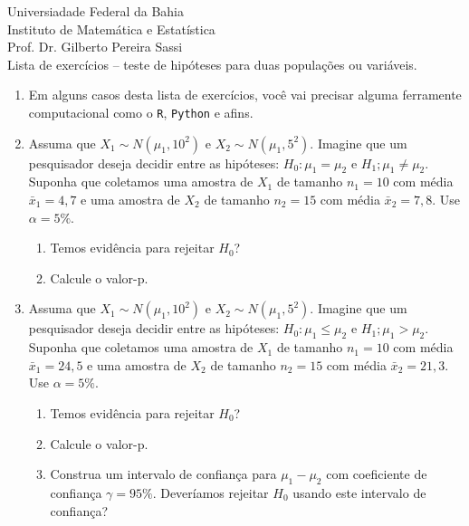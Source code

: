 \documentclass[8pt, a4paper]{article}
\begin{document}
\begin{center}
Universiadade Federal da Bahia\\
Instituto de Matemática e Estatística\\
Prof. Dr. Gilberto Pereira Sassi\\
\vspace{1cm}
Lista de exercícios -- teste de hipóteses para duas populações ou variáveis.
\vspace{1cm}
\end{center}

\begin{enumerate}
	\item[] Em alguns casos desta lista de exercícios, você vai precisar alguma ferramente computacional como o \texttt{R}, \texttt{Python} e afins.
	\item Assuma que $X_1 \sim N(\mu_1, 10^2)$ e $X_2 \sim N(\mu_1, 5^2)$. Imagine que um pesquisador deseja decidir entre as hipóteses: $H_0: \mu_1 = \mu_2$  e $H_1; \mu_1 \neq \mu_2$. Suponha que coletamos uma amostra de $X_1$ de tamanho $n_1=10$ com média $\bar{x}_1=4,7$ e uma amostra de $X_2$ de tamanho $n_2=15$ com média $\bar{x}_2=7,8$. Use $\alpha=5\%$.
	\begin{enumerate}
		\item Temos evidência para rejeitar $H_0$?
		\item Calcule o valor-p. 
	\end{enumerate}

	\item Assuma que $X_1 \sim N(\mu_1, 10^2)$ e $X_2 \sim N(\mu_1, 5^2)$. Imagine que um pesquisador deseja decidir entre as hipóteses: $H_0: \mu_1 \leq \mu_2$  e $H_1; \mu_1 > \mu_2$. Suponha que coletamos uma amostra de $X_1$ de tamanho $n_1=10$ com média $\bar{x}_1=24,5$ e uma amostra de $X_2$ de tamanho $n_2=15$ com média $\bar{x}_2=21,3$. Use $\alpha=5\%$.
	\begin{enumerate}
		\item Temos evidência para rejeitar $H_0$?
		\item Calcule o valor-p. 
		\item Construa um intervalo de confiança para $\mu_1 - \mu_2$ com coeficiente de confiança $\gamma=95\%$. Deveríamos rejeitar $H_0$ usando este intervalo de confiança?
	\end{enumerate}


\end{enumerate}
\end{document}
